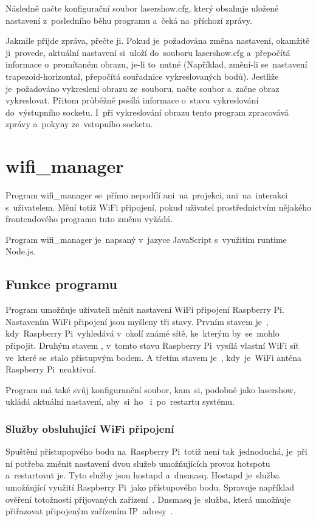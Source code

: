 Následně načte konfigurační soubor lasershow.cfg, který obsahuje uložené nastavení z~posledního běhu programu a~čeká na~příchozí zprávy.

Jakmile přijde zpráva, přečte ji. Pokud je~požadována změna nastavení, okamžitě ji~provede, aktuální nastavení si~uloží do~souboru lasershow.cfg a~přepočítá informace o~promítaném obrazu, je-li to~nutné (Například, změní-li se~nastavení trapezoid-horizontal, přepočítá souřadnice vykreslovaných bodů).
Jestliže je~požadováno vykreslení obrazu ze~souboru, načte soubor a~začne obraz vykreslovat.
Přitom průběžně posílá informace o~stavu vykreslování do~výstupního socketu.
I~při vykreslování obrazu tento program zpracovává zprávy a~pokyny ze~vstupního socketu.

\section{wifi\_manager}

Program wifi\_manager se~přímo nepodílí ani~na~projekci, ani~na~interakci s~uživatelem. Mění totiž WiFi připojení, pokud uživatel prostřednictvím nějakého frontendového programu tuto změnu vyžádá.

Program wifi\_manager je~napsaný v~jazyce JavaScript s~využitím runtime Node.js.

\subsection{Funkce programu}
Program umožňuje uživateli měnit nastavení WiFi připojení Raspberry Pi. Nastavením WiFi připojení jsou myšleny tři stavy.
Prvním stavem je~, kdy~Raspberry Pi~vyhledává v~okolí známé sítě, ke~kterým by~se~mohlo připojit.
Druhým stavem , v~tomto stavu Raspberry Pi~vysílá vlastní WiFi síť ve~které se~stalo přístupvým bodem.
A třetím stavem je~, kdy~je~WiFi anténa Raspberry Pi~neaktivní.

Program má také svůj konfiguranční soubor, kam~si, podobně jako lasershow, ukládá aktuální nastavení, aby~si~ho~ i~po~restartu systému.

\subsubsection{Služby obsluhující WiFi připojení}
Spuštění přístupopvého bodu na~Raspberry Pi~totiž není tak~jednoduchá, je~při ní potřeba změnit nastavení dvou služeb umožňujících provoz hotspotu a~restartovat je. Tyto služby jsou hostapd a~dnsmasq.
Hostapd je~služba umožňující využití Raspberry Pi~jako přístupového bodu. Spravuje například ověření totožnosti přijovaných zařízení~\cite{hostapd}. Dnsmasq je~služba, která umožňuje přiřazovat připojeným zařízením IP~adresy~\cite{dnsmasq}.

